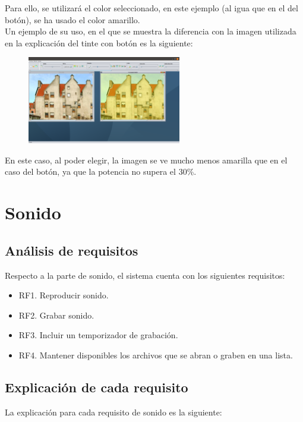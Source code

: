 \documentclass[11pt,a4paper]{article}
\begin{document}
Para ello, se utilizará el color seleccionado, en este ejemplo (al igua que en el del botón), se ha usado el color amarillo.\\

Un ejemplo de su uso, en el que se muestra la diferencia con la imagen utilizada en la explicación del tinte con botón es la siguiente:

\begin{figure}[H]
\centering
	\includegraphics[width=0.6\textwidth]{img/tintedes.png}
\end{figure}

En este caso, al poder elegir, la imagen se ve mucho menos amarilla que en el caso del botón, ya que la potencia no supera el 30\%.

\newpage

\section{Sonido}

\subsection{Análisis de requisitos}
Respecto a la parte de sonido, el sistema cuenta con los siguientes requisitos:

\begin{itemize}
	\item RF1. Reproducir sonido.
	\item RF2. Grabar sonido.
	\item RF3. Incluir un temporizador de grabación.
	\item RF4. Mantener disponibles los archivos que se abran o graben en una lista.
\end{itemize}

\subsection{Explicación de cada requisito}
La explicación para cada requisito de sonido es la siguiente:
\end{document}
